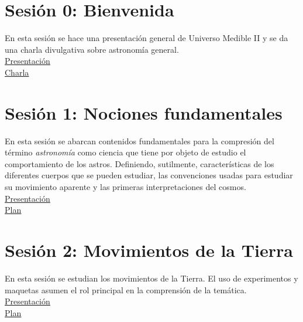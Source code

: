 \documentclass[10pt,a4paper]{article}
\begin{document}
\section{Sesión 0: Bienvenida}
En esta sesión se hace una presentación general de Universo Medible II y se da una charla divulgativa sobre astronomía general. \\ 

\href{https://github.com/miguelta281/Universo_Medible_II/blob/master/Presentaciones/Sesiones/Bienvenida/Bienvenida.pdf}{\underline{Presentación}} \\

\href{https://github.com/miguelta281/Universo_Medible_II/blob/master/Presentaciones/Sesiones/Bienvenida/Charla_bienvenida/Fetu.pdf}{\underline{Charla}} 
\section{Sesión 1: Nociones fundamentales}
En esta sesión se abarcan contenidos fundamentales para la compresión del término \textit{astronomía} como ciencia que tiene por objeto de estudio el comportamiento de los astros. Definiendo, sutilmente, características de los diferentes cuerpos que se pueden estudiar, las convenciones usadas para estudiar su movimiento aparente y las primeras interpretaciones del cosmos.\\

\href{https://github.com/miguelta281/Universo_Medible_II/blob/master/Presentaciones/Sesiones/Sesion_1/sesion_1.pdf}{\underline{Presentación}} \\

\href{https://github.com/miguelta281/Universo_Medible_II/blob/master/Organizacion/Planes/Sesion_1/Plan_sesion_1.pdf}{\underline{Plan}} \\

\section{Sesión 2: Movimientos de la Tierra}
En esta sesión se estudian los movimientos de la Tierra. El uso de experimentos y maquetas asumen el rol principal en la comprensión de la temática. \\

\href{https://github.com/miguelta281/Universo_Medible_II/blob/master/Presentaciones/Sesiones/Sesion_2/sesion_2.pdf}{\underline{Presentación}} \\

\href{https://github.com/miguelta281/Universo_Medible_II/blob/master/Organizacion/Planes/Sesion_2/Plan_sesion_2.pdf}{\underline{Plan}} \\
\end{document}
